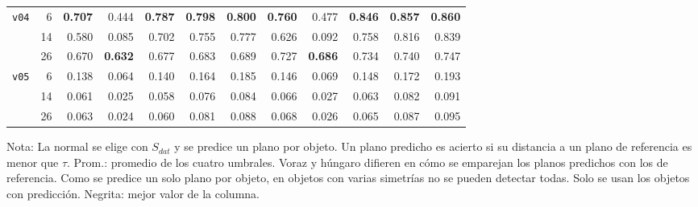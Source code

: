 \begin{table}[htbp]
\begin{lrbox}{\tablebox}
\begin{adjustbox}{max width=\textwidth}
\begin{tabular}{lrrrrrrrrrrr}
\midrule
\multirow{3}{*}{\texttt{v04}} & 6 & \textbf{0.707} & 0.444 & \textbf{0.787} & \textbf{0.798} & \textbf{0.800} & \textbf{0.760} & 0.477 & \textbf{0.846} & \textbf{0.857} & \textbf{0.860} \\
 & 14 & 0.580 & 0.085 & 0.702 & 0.755 & 0.777 & 0.626 & 0.092 & 0.758 & 0.816 & 0.839 \\
 & 26 & 0.670 & \textbf{0.632} & 0.677 & 0.683 & 0.689 & 0.727 & \textbf{0.686} & 0.734 & 0.740 & 0.747 \\
\midrule
\multirow{3}{*}{\texttt{v05}} & 6 & 0.138 & 0.064 & 0.140 & 0.164 & 0.185 & 0.146 & 0.069 & 0.148 & 0.172 & 0.193 \\
 & 14 & 0.061 & 0.025 & 0.058 & 0.076 & 0.084 & 0.066 & 0.027 & 0.063 & 0.082 & 0.091 \\
 & 26 & 0.063 & 0.024 & 0.060 & 0.081 & 0.088 & 0.068 & 0.026 & 0.065 & 0.087 & 0.095 \\
\bottomrule
\end{tabular}
\end{adjustbox}
\end{lrbox}
\usebox{\tablebox}

\vspace{1.5ex}
\begin{minipage}{\wd\tablebox}
\footnotesize
Nota: La normal se elige con $S_{dat}$ y se predice un plano por objeto. Un plano predicho es acierto si su distancia a un plano de referencia es menor que $\tau$. Prom.: promedio de los cuatro umbrales. Voraz y húngaro difieren en cómo se emparejan los planos predichos con los de referencia. Como se predice un solo plano por objeto, en objetos con varias simetrías no se pueden detectar todas. Solo se usan los objetos con predicción. Negrita: mejor valor de la columna.
\end{minipage}
\end{table}


